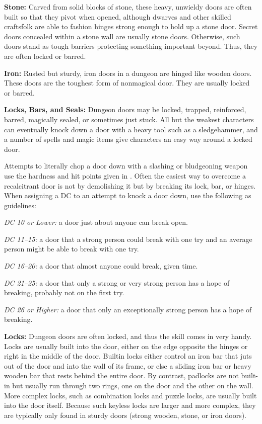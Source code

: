 \textbf{Stone:} Carved from solid blocks of stone, these heavy, unwieldy doors are often built so that they pivot when opened, although dwarves and other skilled craftsfolk are able to fashion hinges strong enough to hold up a stone door. Secret doors concealed within a stone wall are usually stone doors. Otherwise, such doors stand as tough barriers protecting something important beyond. Thus, they are often locked or barred.

\textbf{Iron:} Rusted but sturdy, iron doors in a dungeon are hinged like wooden doors. These doors are the toughest form of nonmagical door. They are usually locked or barred.

\textbf{Locks, Bars, and Seals:} Dungeon doors may be locked, trapped, reinforced, barred, magically sealed, or sometimes just stuck. All but the weakest characters can eventually knock down a door with a heavy tool such as a sledgehammer, and a number of spells and magic items give characters an easy way around a locked door.

Attempts to literally chop a door down with a slashing or bludgeoning weapon use the hardness and hit points given in . Often the easiest way to overcome a recalcitrant door is not by demolishing it but by breaking its lock, bar, or hinges. When assigning a DC to an attempt to knock a door down, use the following as guidelines:

\textit{DC 10 or Lower:} a door just about anyone can break open.

\textit{DC 11--15:} a door that a strong person could break with one try and an average person might be able to break with one try.

\textit{DC 16--20:} a door that almost anyone could break, given time.

\textit{DC 21--25:} a door that only a strong or very strong person has a hope of breaking, probably not on the first try.

\textit{DC 26 or Higher:} a door that only an exceptionally strong person has a hope of breaking.


\textbf{Locks:} Dungeon doors are often locked, and thus the  skill comes in very handy. Locks are usually built into the door, either on the edge opposite the hinges or right in the middle of the door. Builtin locks either control an iron bar that juts out of the door and into the wall of its frame, or else a sliding iron bar or heavy wooden bar that rests behind the entire door. By contrast, padlocks are not built-in but usually run through two rings, one on the door and the other on the wall. More complex locks, such as combination locks and puzzle locks, are usually built into the door itself. Because such keyless locks are larger and more complex, they are typically only found in sturdy doors (strong wooden, stone, or iron doors).

